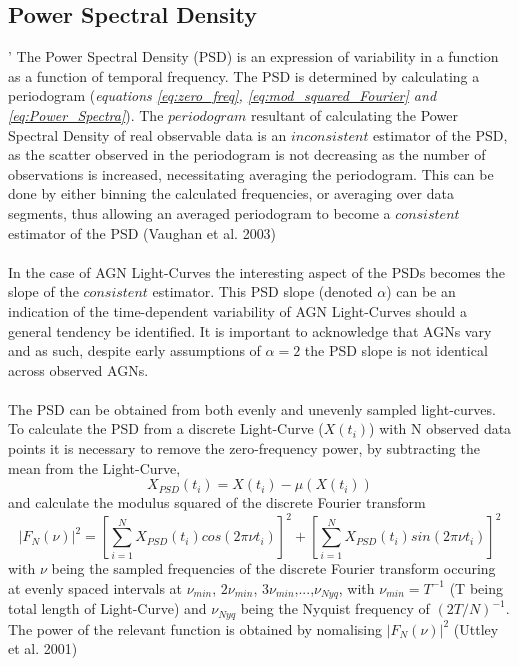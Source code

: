 \documentclass[a4paper, 12pt, twoside]{article}
\begin{document}
\subsection{Power Spectral Density}' \label{PSD}
The Power Spectral Density (PSD) is an expression of variability in a function as a function of temporal frequency. The PSD is determined by calculating a periodogram (\emph{equations \ref{eq:zero_freq}, \ref{eq:mod_squared_Fourier} and \ref{eq:Power_Spectra}}). The $periodogram$ resultant of calculating the Power Spectral Density of real observable data is an $inconsistent$ estimator of the PSD, as the scatter observed in the periodogram is not decreasing as the number of observations is increased, necessitating averaging the periodogram. This can be done by either binning the calculated frequencies, or averaging over data segments, thus allowing an averaged periodogram to become a $consistent$ estimator of the PSD (Vaughan et al. 2003) \\
\\
In the case of AGN Light-Curves the interesting aspect of the PSDs becomes the slope of the $consistent$ estimator. This PSD slope (denoted $\alpha$) can be an indication of the time-dependent variability of AGN Light-Curves should a general tendency be identified. It is important to acknowledge that AGNs vary and as such, despite early assumptions of $\alpha=2$ the PSD slope is not identical across observed AGNs.\\
\\
The PSD can be obtained from both evenly and unevenly sampled light-curves. To calculate the PSD from a discrete Light-Curve ($X(t_{i})$) with N observed data points it is necessary to remove the zero-frequency power, by subtracting the mean from the Light-Curve,
\begin{equation}
X_{PSD}(t_{i}) = X(t_{i}) - \mu(X(t_{i}))
\label{eq:zero_freq}
\end{equation} 
and calculate the modulus squared of the discrete Fourier transform
\begin{equation}
|F_{N}(\nu)|^{2} = [\sum_{{i=1}}^{N}X_{PSD}(t_{i})cos(2\pi\nu t_{i})]^{2} + [\sum_{{i=1}}^{N}X_{PSD}(t_{i})sin(2\pi\nu t_{i})]^{2}
\label{eq:mod_squared_Fourier}
\end{equation} 
with $\nu$ being the sampled frequencies of the discrete Fourier transform occuring at evenly spaced intervals at $\nu_{min}$, $2\nu_{min}$, $3\nu_{min}$,...,$\nu_{Nyq}$, with $\nu_{min} = T^{-1}$ (T being total length of Light-Curve) and $\nu_{Nyq}$ being the Nyquist frequency of $(2T/N)^{-1}$. The power of the relevant function is obtained by nomalising $|F_{N}(\nu)|^{2}$ (Uttley et al. 2001)
\end{document}
